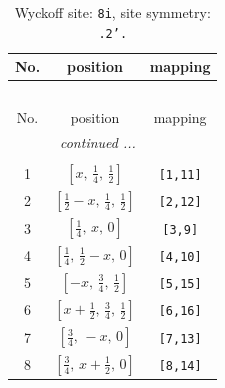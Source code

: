 \documentclass[fleqn,8pt]{jsarticle}
\begin{document}
\begin{longtable}{ccc}
\caption{Wyckoff site: {\tt 8i}, site symmetry: {\tt .2'.}}
 \\
 \hline \hline
No. & position & mapping \\ \hline \endfirsthead

\multicolumn{2}{l}{\tablename\ \thetable{}} \\
 \hline \hline
No. & position & mapping \\ \hline \endhead

 \hline \hline
\multicolumn{2}{r}{\footnotesize\it continued ...} \\ \endfoot

 \hline \hline
\multicolumn{2}{r}{} \\ \endlastfoot

1 & $\left[ x,\, \frac{1}{4},\, \frac{1}{2} \right]$ & {\tt [1,11]} \\ \hline
2 & $\left[ \frac{1}{2} - x,\, \frac{1}{4},\, \frac{1}{2} \right]$ & {\tt [2,12]} \\ \hline
3 & $\left[ \frac{1}{4},\, x,\, 0 \right]$ & {\tt [3,9]} \\ \hline
4 & $\left[ \frac{1}{4},\, \frac{1}{2} - x,\, 0 \right]$ & {\tt [4,10]} \\ \hline
5 & $\left[ - x,\, \frac{3}{4},\, \frac{1}{2} \right]$ & {\tt [5,15]} \\ \hline
6 & $\left[ x + \frac{1}{2},\, \frac{3}{4},\, \frac{1}{2} \right]$ & {\tt [6,16]} \\ \hline
7 & $\left[ \frac{3}{4},\, - x,\, 0 \right]$ & {\tt [7,13]} \\ \hline
8 & $\left[ \frac{3}{4},\, x + \frac{1}{2},\, 0 \right]$ & {\tt [8,14]} \\
\end{longtable}
\renewcommand{\arraystretch}{1.2}
\end{document}
